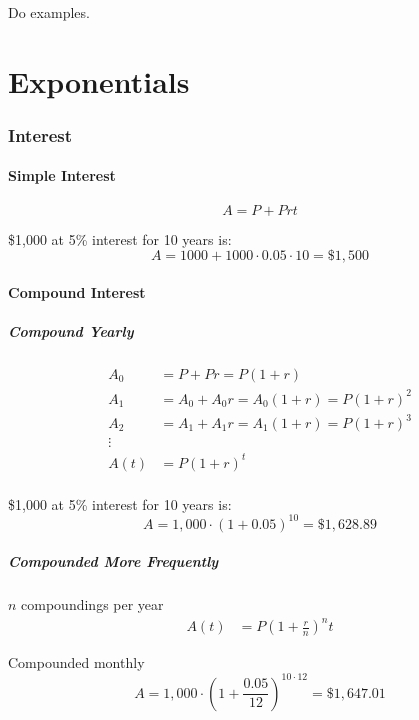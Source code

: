 \documentclass[letterpaper, portrait]{exam}
\begin{document}
  Do examples.

  \part{Exponentials} %
  
  \section{Interest}

  \subsection{Simple Interest} %
  \[
    A = P + Prt
  \]

  \$1,000 at 5\% interest for 10 years is:
  \[
    A = 1000 + 1000 \cdot 0.05 \cdot 10 = \$1,500
  \]

  \subsection{Compound Interest} %

  \subsubsection{Compound Yearly} %
  \begin{align*}
    A_0 &= P + Pr = P(1 + r) \\
    A_1 &= A_0 + A_0 r = A_0 (1 + r) = P(1 + r)^2 \\
    A_2 &= A_1 + A_1 r = A_1 (1 + r) = P(1 + r)^3 \\
    \vdots \\
    A(t) &= P(1 + r)^t \\
  \end{align*}
  
  \$1,000 at 5\% interest for 10 years is:
  \[
    A = 1,000 \cdot (1 + 0.05)^{10} = \$1,628.89
  \]

  \subsubsection{Compounded More Frequently} %

  $n$ compoundings per year
  \begin{align*}
    A(t) &= P \left(1 + \frac{r}{n} \right)^nt
  \end{align*}
  
  Compounded monthly
  \[
    A = 1,000 \cdot \left( 1 + \frac{0.05}{12} \right)^{10 \cdot 12} = \$1,647.01
  \]
\end{document}
